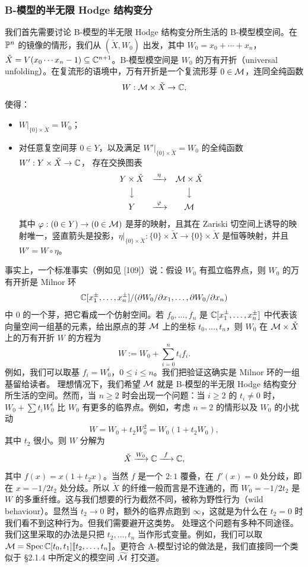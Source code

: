 \subsubsection{B-模型的半无限 Hodge 结构变分}
我们首先需要讨论 B-模型的半无限 Hodge 结构变分所生活的 B-模型模空间。在 $\mathbb{P}^n$ 的镜像的情形，我们从 $(\check X,W_0)$ 出发，其中 $W_0=x_0+\cdots+x_n$，$\check X=V(x_0\cdots x_n-1)\subseteq\mathbb{C}^{n+1}$。B-模型模空间是 $W_0$ 的万有开折（universal unfolding）。在复流形的语境中，万有开折是一个复流形芽 $0\in\mathcal{M}$，连同全纯函数
\[
W:\mathcal{M}\times\check X\to\mathbb{C},
\]
使得：
\begin{itemize}[leftmargin=2em]
\item $W|_{\{0\}\times\check X}=W_0$；
\item 对任意复空间芽 $0\in Y$，以及满足 $W'|_{\{0\}\times\check X}=W_0$ 的全纯函数 $W':Y\times\check X\to\mathbb{C}$，
存在交换图表
\[
\begin{array}{ccc}
Y\times\check X&\xrightarrow{\ \eta\ }&\mathcal{M}\times\check X\\[4pt]
\big\downarrow&&\big\downarrow\\[4pt]
Y&\xrightarrow{\ \varphi\ }&\mathcal{M}
\end{array}
\]
其中 $\varphi:(0\in Y)\to(0\in\mathcal{M})$ 是芽的映射，且其在 Zariski 切空间上诱导的映射唯一，竖直箭头是投影，$\eta|_{\{0\}\times\check X}:\{0\}\times\check X\to\{0\}\times\check X$ 是恒等映射，并且 $W'=W\circ\eta$。
\end{itemize}
事实上，一个标准事实（例如见 [109]）说：假设 $W_0$ 有孤立临界点，则 $W_0$ 的万有开折是 Milnor 环
\[
\mathbb{C}[x_1^{\pm},\dots,x_n^{\pm}]/(\partial W_0/\partial x_1,\dots,\partial W_0/\partial x_n)
\]
中 $0$ 的一个芽，把它看成一个仿射空间。若 $f_0,\dots,f_n$ 是 $\mathbb{C}[x_1^{\pm},\dots,x_n^{\pm}]$ 中代表该向量空间一组基的元素，给出原点的芽 $\mathcal{M}$ 上的坐标 $t_0,\dots,t_n$，则 $W_0$ 在 $\mathcal{M}\times\check X$ 上的万有开折 $W$ 的方程为
\[
W:=W_0+\sum_{i=0}^{n}t_if_i.
\]
例如，我们可以取基 $f_i=W_0^i$，$0\le i\le n$。我们把验证这确实是 Milnor 环的一组基留给读者。
理想情况下，我们希望 $\mathcal{M}$ 就是 B-模型的半无限 Hodge 结构变分所生活的空间。然而，当 $n\ge2$ 时会出现一个问题：当 $i\ge2$ 的 $t_i\neq0$ 时，$W_0+\sum t_iW_0^i$ 比 $W_0$ 有更多的临界点。例如，考虑 $n=2$ 的情形以及 $W_0$ 的小扰动
\[
W=W_0+t_2W_0^2=W_0(1+t_2W_0),
\]
其中 $t_2$ 很小。则 $W$ 分解为
\[
\check X\xrightarrow{W_0}\mathbb{C}\xrightarrow{\ f\ }\mathbb{C},
\]
其中 $f(x)=x(1+t_2x)$。当然 $f$ 是一个 $2:1$ 覆叠，在 $f'(x)=0$ 处分歧，即在 $x=-1/2t_2$ 处分歧。所以 $\check X$ 的纤维一般而言是不连通的，而 $W_0=-1/2t_2$ 是 $W$ 的多重纤维。这与我们想要的行为截然不同，被称为野性行为（wild behaviour）。显然当 $t_2\to0$ 时，额外的临界点跑到 $\infty$，这就是为什么在 $t_2=0$ 时我们看不到这种行为。但我们需要避开这类势。
处理这个问题有多种不同途径。我们这里采取的办法是只把 $t_2,\dots,t_n$ 当作形式变量。例如，我们可以取 $\mathcal{M}=\operatorname{Spec}\mathbb{C}[t_0,t_1][\![t_2,\dots,t_n]\!]$。更符合 A-模型讨论的做法是，我们直接同一个类似于 §2.1.4 中所定义的模空间 $\widetilde{\mathcal{M}}$ 打交道。

